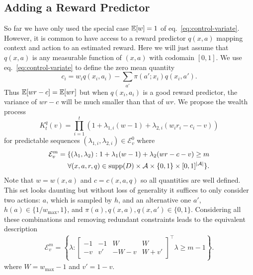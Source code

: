 \subsection{Adding a Reward Predictor}
So far we have only used the special case $\mathbb{E}[w]=1$ of
eq.~\eqref{eq:control-variate}. However, it is common to have access to a
reward predictor $q(x,a)$ mapping context and action to an estimated reward.
Here we will just assume that $q(x,a)$ is any measurable function of $(x,a)$
with codomain $[0,1]$. We use eq.~\eqref{eq:control-variate} to define the 
zero mean quantity
\begin{equation}
c_i=w_i q(x_i,a_i)-\sum_{a'}\pi(a';x_i)q(x_i,a').    
\label{eq:ci-defn}
\end{equation}
Thus $\mathbb{E}[wr-c]=\mathbb{E}[wr]$ but when $q(x_i, a_i)$ is a good 
reward predictor, the variance of $wr - c$ will be much 
smaller than that of $wr$. We propose the wealth process
\[
K_t^q(v)=\prod_{i=1}^{t}\left(1+\lambda_{1,i} (w-1)+\lambda_{2,i}(w_i r_i-c_i-v)\right)
\]
for predictable sequences 
$(\lambda_{1,i}, \lambda_{2,i}) \in \mathcal{E}_{v}^0$ where
\begin{align*}
\mathcal{E}_v^{m} =
\{(\lambda_1,\lambda_2):  1+\lambda_1(w-1)+\lambda_2(wr-c-v)\geq m \notag\\
\forall (x,a,r,q) \in \operatorname{supp}(D) \times \mathcal{A} \times \{0,1\} \times [0,1]^{|\mathcal{A}|}
\}.
\end{align*}
Note that $w=w(x, a)$ and $c=c(x,a,q)$ so all quantities are well defined.
This set looks daunting but without loss of generality it suffices to
only consider two 
actions: $a$, which is sampled by $h$, and an alternative one $a'$,
$h(a) \in \{1/w_{\max},1\}$, and $\pi(a),q(x,a),q(x,a') \in \{0,1\}$.
Considering all these combinations and removing redundant constraints 
leads to the equivalent description
\begin{align}
\mathcal{E}_v^{m} =
\left\{\lambda:  
\left[\begin{array}{cccc}
-1 & -1 & W & W \\ 
-v & v' & -W-v & W+v'
\end{array}\right]^\top
\lambda \geq m - 1 \label{eq:rp-explicit-domain}
\right\}.
\end{align}
where $W = w_{\max}-1$ and $v'=1-v$.

